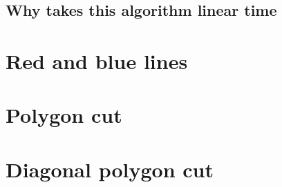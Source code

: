 \documentclass{article}
\begin{document}
\begin{empfile}
\subsection{Why takes this algorithm linear time}

\section{Red and blue lines}
\section{Polygon cut}
\section{Diagonal polygon cut}
\end{empfile}
\end{document}
